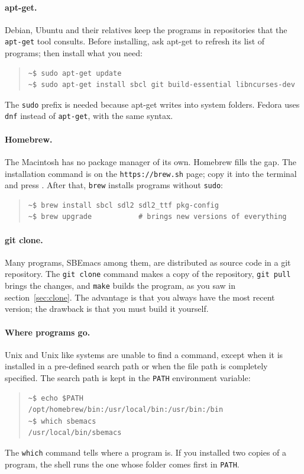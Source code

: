 \documentclass[a4paper,12pt,openany]{book}
\begin{document}
\paragraph{apt-get.} Debian, Ubuntu and their relatives
keep the programs in repositories that the \verb|apt-get| tool
consults. Before installing, ask apt-get to refresh its list of
programs; then install what you need:
\begin{quote}
\begin{verbatim}
~$ sudo apt-get update
~$ sudo apt-get install sbcl git build-essential libncurses-dev
\end{verbatim}
\end{quote}
The \verb|sudo| prefix is needed because apt-get writes into
system folders. Fedora uses \verb|dnf| instead of
\verb|apt-get|, with the same syntax.

\paragraph{Homebrew.} The Macintosh has no package
manager of its own. Homebrew fills the gap. The installation
command is on the \verb|https://brew.sh| page; copy it into the
terminal and press . After that, \verb|brew| installs
programs without \verb|sudo|:
\begin{quote}
\begin{verbatim}
~$ brew install sbcl sdl2 sdl2_ttf pkg-config
~$ brew upgrade           # brings new versions of everything
\end{verbatim}
\end{quote}

\paragraph{git clone.} Many programs, SBEmacs among them,
are distributed as source code in a git repository. The
\verb|git clone| command makes a copy of the repository, \verb|git pull|
brings the changes, and \verb|make| builds the program, as you saw
in section~\ref{sec:clone}. The advantage is that you always
have the most recent version; the drawback is that you must build
it yourself.

\paragraph{Where programs go.} Unix and Unix like systems
are unable to find a command, except when
it is installed in a pre-defined search
path or when the file path is completely
specified. The search path is kept in the \verb|PATH| environment
variable:
\begin{quote}
\begin{verbatim}
~$ echo $PATH
/opt/homebrew/bin:/usr/local/bin:/usr/bin:/bin
~$ which sbemacs
/usr/local/bin/sbemacs
\end{verbatim}
\end{quote}
The \verb|which| command tells where a program is. If you
installed two copies of a program, the shell runs the one whose
folder comes first in \verb|PATH|.
\end{document}
